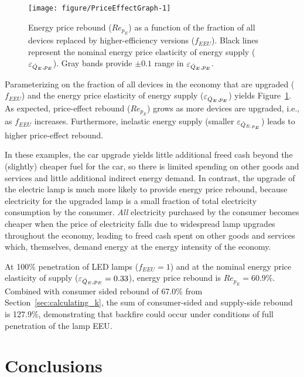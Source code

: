 \documentclass[12pt]{article}\usepackage[]{graphicx}\usepackage[]{xcolor}
\newenvironment{knitrout}{}{} %
\begin{document}
\begin{knitrout}
\color{fgcolor}\begin{figure}
\texttt{[image: figure/PriceEffectGraph-1]} \caption{Energy price rebound ($Re_{p_{E}}$) as a function of the fraction of all devices replaced by higher-efficiency versions ($f_{EEU}$). Black lines represent the nominal energy price elasticity of energy supply ($\varepsilon_{\dot{Q}_E,p_E}$). Gray bands provide $\pm 0.1$ range in $\varepsilon_{\dot{Q}_E,p_E}$.}\label{fig:PriceEffectGraph}
\end{figure}

\end{knitrout}


Parameterizing on the fraction of all devices in the economy
that are upgraded ($f_{EEU}$) and
the energy price elasticity of energy supply
($\varepsilon_{\dot{Q}_E,p_E}$) yields
Figure~\ref{fig:PriceEffectGraph}.
As expected,
price-effect rebound ($Re_{p_E}$)
grows as more devices are upgraded,
i.e., as $f_{EEU}$ increases.
Furthermore, inelastic energy supply (smaller $\varepsilon_{\dot{Q}_{E,p_E}}$)
leads to higher price-effect rebound.

In these examples, the car upgrade yields
little additional freed cash beyond the
(slightly) cheaper fuel for the car,
so there is limited spending on other goods and services
and little additional indirect energy demand.
In contrast, the upgrade of the electric lamp
is much more likely to provide energy price rebound,
because electricity for the upgraded lamp is
a small fraction of total electricity consumption
by the consumer.
\emph{All} electricity purchased by the consumer becomes cheaper
when the price of electricity falls due to
widespread lamp upgrades throughout the economy,
leading to freed cash spent on other goods and services
which, themselves, demand energy at the energy intensity
of the economy.



At 100\% penetration of LED lamps ($f_{EEU} = 1$) and
at the nominal energy price elasticity of supply
($\varepsilon_{\dot{Q}_{E},p_E} = 0.33$),
energy price rebound is $Re_{p_E} =
60.9$\%.
Combined with consumer sided rebound of
67.0\%
from Section~\ref{sec:calculating_k},
the sum of consumer-sided and supply-side rebound is
127.9\%,
demonstrating that backfire could occur under conditions
of full penetration of the lamp EEU.


\section{Conclusions}
\label{sec:conclusion}
\end{document}
